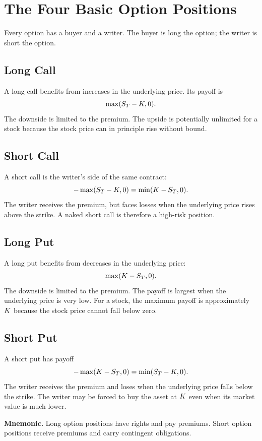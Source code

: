 \section{The Four Basic Option Positions}

Every option has a buyer and a writer. The buyer is long the option; the writer
is short the option.

\subsection{Long Call}

A long call benefits from increases in the underlying price. Its payoff is
\[
    \max(S_T-K,0).
\]
The downside is limited to the premium. The upside is potentially unlimited for
a stock because the stock price can in principle rise without bound.

\subsection{Short Call}

A short call is the writer's side of the same contract:
\[
    -\max(S_T-K,0)=\min(K-S_T,0).
\]
The writer receives the premium, but faces losses when the underlying price
rises above the strike. A naked short call is therefore a high-risk position.

\subsection{Long Put}

A long put benefits from decreases in the underlying price:
\[
    \max(K-S_T,0).
\]
The downside is limited to the premium. The payoff is largest when the
underlying price is very low. For a stock, the maximum payoff is approximately
$K$ because the stock price cannot fall below zero.

\subsection{Short Put}

A short put has payoff
\[
    -\max(K-S_T,0)=\min(S_T-K,0).
\]
The writer receives the premium and loses when the underlying price falls below
the strike. The writer may be forced to buy the asset at $K$ even when its
market value is much lower.

\begin{boxF}
\textbf{Mnemonic.} Long option positions have rights and pay premiums. Short
option positions receive premiums and carry contingent obligations.
\end{boxF}

